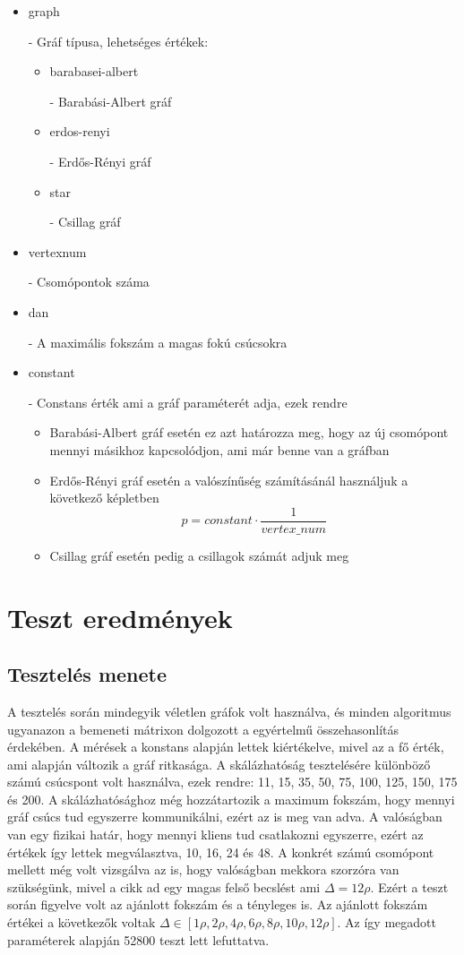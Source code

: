 \documentclass[12pt]{report}
\newcommand{\cmd}[1]{\colorbox{gray!10}{\strut #1}}
\begin{document}
\begin{itemize}
	\item \cmd{graph} - Gráf típusa, lehetséges értékek:
	\begin{itemize}
		\item \cmd{barabasei-albert} - Barabási-Albert gráf
		\item \cmd{erdos-renyi} - Erdős-Rényi gráf
		\item \cmd{star} - Csillag gráf
	\end{itemize}
	
	\item \cmd{vertex\textunderscore num} - Csomópontok száma
	\item \cmd{dan} - A maximális fokszám a magas fokú csúcsokra
	\item \cmd{constant} - Constans érték ami a gráf paraméterét adja, ezek rendre
	
	\begin{itemize}
		\item Barabási-Albert gráf esetén ez azt határozza meg, hogy az új csomópont mennyi másikhoz kapcsolódjon, ami már benne van a gráfban
		\item Erdős-Rényi gráf esetén a valószínűség számításánál használjuk a következő képletben  \[p = constant \cdot \frac{1}{vertex\_num}\]
		\item Csillag gráf esetén pedig a csillagok számát adjuk meg
	\end{itemize}
\end{itemize}

\chapter{Teszt eredmények}

\section{Tesztelés menete}

A tesztelés során mindegyik véletlen gráfok volt használva, és minden algoritmus ugyanazon a bemeneti mátrixon dolgozott a egyértelmű összehasonlítás érdekében. 
A mérések a konstans alapján lettek kiértékelve, mivel az a fő érték, ami alapján változik a gráf ritkasága.
A skálázhatóság tesztelésére különböző számú csúcspont volt használva, ezek rendre: 11, 15, 35, 50, 75, 100, 125, 150, 175 és 200.
A skálázhatósághoz még hozzátartozik a maximum fokszám, hogy mennyi gráf csúcs tud egyszerre kommunikálni, ezért az is meg van adva.
A valóságban van egy fizikai határ, hogy mennyi kliens tud csatlakozni egyszerre, ezért az értékek így lettek megválasztva, 10, 16, 24 és 48.
A konkrét számú csomópont mellett még volt vizsgálva az is, hogy valóságban mekkora szorzóra van szükségünk, mivel a cikk ad egy magas felső becslést ami $\Delta=12\rho$.
Ezért a teszt során figyelve volt az ajánlott fokszám és a tényleges is.
Az ajánlott fokszám értékei a következők voltak $\Delta\in[1\rho, 2\rho, 4\rho, 6\rho, 8\rho, 10\rho, 12\rho]$.
Az így megadott paraméterek alapján 52800 teszt lett lefuttatva.
\end{document}
